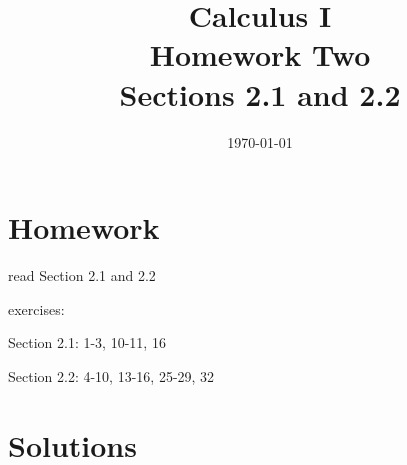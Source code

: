 \documentclass[letterpaper, landscape]{exam}
\title{Calculus I \\ Homework Two \\ Sections 2.1 and 2.2}
\author{}
\date{\today}
\begin{document}
  \maketitle

  \section{Homework}
    \begin{itemize*}
      \item read Section 2.1 and 2.2
      \item exercises: 
        \begin{itemize*}
          \item Section 2.1: 1-3, 10-11, 16
          \item Section 2.2: 4-10, 13-16, 25-29, 32
        \end{itemize*}
    \end{itemize*}

  \ifprintanswers

    \section{Solutions}
\end{document}
